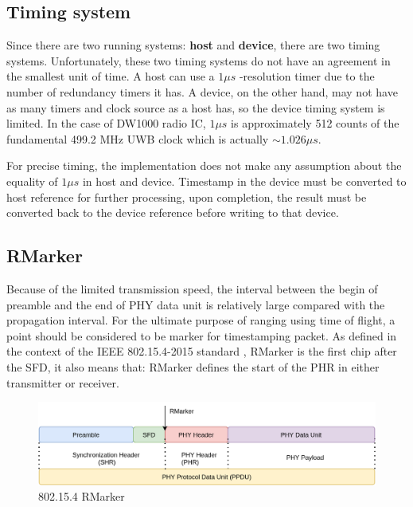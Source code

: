 \documentclass[\main/main.tex]{subfiles}
\begin{document}
\subsection{Timing system}
\label{subsec:timing_system_subsection}
Since there are two running systems: \textbf{host} and \textbf{device}, there are two timing systems. Unfortunately, these two timing systems do not have an agreement in the smallest unit of time. A host can use a $1\mu s$ -resolution timer due to the number of redundancy timers it has. A device, on the other hand, may not have as many timers and clock source as a host has, so the device timing system is limited. In the case of DW1000 radio IC, $1\mu s$ is approximately 512 counts of the fundamental 499.2 MHz UWB clock which is actually \textbf{$\sim 1.026\mu s$}. 

For precise timing, the implementation does not make any assumption about the equality of $1\mu s$ in host and device. Timestamp in the device must be converted to host reference for further processing, upon completion, the result must be converted back to the device reference before writing to that device. 
\subsection{RMarker}
Because of the limited transmission speed, the interval between the begin of preamble and the end of PHY data unit is relatively large compared with the propagation interval. For the ultimate purpose of ranging using time of flight, a point should be considered to be marker for timestamping packet. As defined in the context of the IEEE 802.15.4-2015 standard \cite{IEEE_Std_802_15_4_2015}, RMarker is the first chip after the SFD, it also means that: RMarker defines the start of the PHR in either transmitter or receiver. 

\begin{figure}[H]
    \begin{center}
        \includegraphics[scale=0.3]{802_15_4_physical.png}
    \end{center}
    \caption{802.15.4 RMarker}
    \label{fig:802_15_4_rmarker}
\end{figure}
\end{document}

